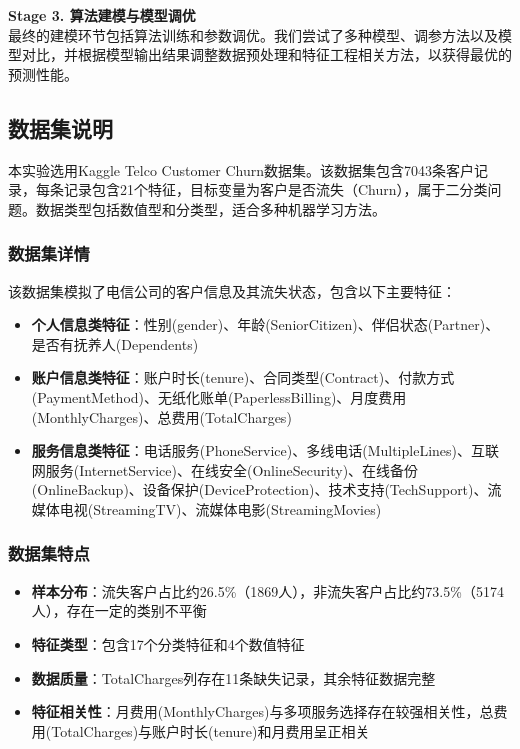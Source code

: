 \documentclass[12pt,a4paper]{article}
\begin{document}
\textbf{Stage 3. 算法建模与模型调优}\\
最终的建模环节包括算法训练和参数调优。我们尝试了多种模型、调参方法以及模型对比，并根据模型输出结果调整数据预处理和特征工程相关方法，以获得最优的预测性能。

\subsection{数据集说明}
本实验选用Kaggle Telco Customer Churn数据集。该数据集包含7043条客户记录，每条记录包含21个特征，目标变量为客户是否流失（Churn），属于二分类问题。数据类型包括数值型和分类型，适合多种机器学习方法。

\subsubsection{数据集详情}
该数据集模拟了电信公司的客户信息及其流失状态，包含以下主要特征：
\begin{itemize}
    \item \textbf{个人信息类特征}：性别(gender)、年龄(SeniorCitizen)、伴侣状态(Partner)、是否有抚养人(Dependents)
    \item \textbf{账户信息类特征}：账户时长(tenure)、合同类型(Contract)、付款方式(PaymentMethod)、无纸化账单(PaperlessBilling)、月度费用(MonthlyCharges)、总费用(TotalCharges)
    \item \textbf{服务信息类特征}：电话服务(PhoneService)、多线电话(MultipleLines)、互联网服务(InternetService)、在线安全(OnlineSecurity)、在线备份(OnlineBackup)、设备保护(DeviceProtection)、技术支持(TechSupport)、流媒体电视(StreamingTV)、流媒体电影(StreamingMovies)
\end{itemize}

\subsubsection{数据集特点}
\begin{itemize}
    \item \textbf{样本分布}：流失客户占比约26.5\%（1869人），非流失客户占比约73.5\%（5174人），存在一定的类别不平衡
    \item \textbf{特征类型}：包含17个分类特征和4个数值特征
    \item \textbf{数据质量}：TotalCharges列存在11条缺失记录，其余特征数据完整
    \item \textbf{特征相关性}：月费用(MonthlyCharges)与多项服务选择存在较强相关性，总费用(TotalCharges)与账户时长(tenure)和月费用呈正相关
\end{itemize}
\end{document}
